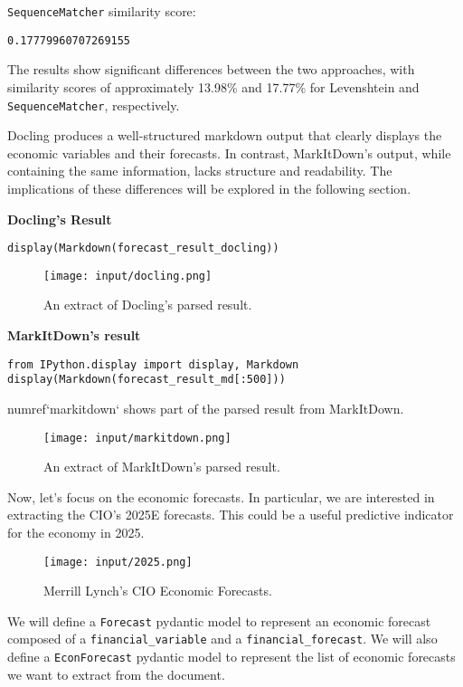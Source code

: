\texttt{SequenceMatcher} similarity score: 
\begin{verbatim}
0.17779960707269155
\end{verbatim}


The results show significant differences between the two approaches, with similarity scores of approximately 13.98\% and 17.77\% for Levenshtein and \texttt{SequenceMatcher}, respectively.

Docling produces a well-structured markdown output that clearly displays the economic variables and their forecasts. In contrast, MarkItDown's output, while containing the same information, lacks structure and readability. The implications of these differences will be explored in the following section.

\textbf{Docling's Result}

\begin{verbatim}
display(Markdown(forecast_result_docling))
\end{verbatim}

\begin{figure}[H]
\centering
\texttt{[image: input/docling.png]}
\caption{An extract of Docling's parsed result.}
\label{docling}
\end{figure}

\textbf{MarkItDown's result}

\begin{verbatim}
from IPython.display import display, Markdown
display(Markdown(forecast_result_md[:500]))
\end{verbatim}

{numref}`markitdown` shows part of the parsed result from MarkItDown.
\begin{figure}[H]
\centering
\texttt{[image: input/markitdown.png]}
\caption{An extract of MarkItDown's parsed result.}
\label{markitdown}
\end{figure}
Now, let's focus on the economic forecasts. In particular, we are interested in extracting the CIO's 2025E forecasts. This could be a useful predictive indicator for the economy in 2025.

\begin{figure}[H]
\centering
\texttt{[image: input/2025.png]}
\caption{Merrill Lynch's CIO Economic Forecasts.}
\label{forecast2025}
\end{figure}

We will define a \texttt{Forecast} pydantic model to represent an economic forecast composed of a \texttt{financial\_variable} and a \texttt{financial\_forecast}. We will also define a \texttt{EconForecast} pydantic model to represent the list of economic forecasts we want to extract from the document.

